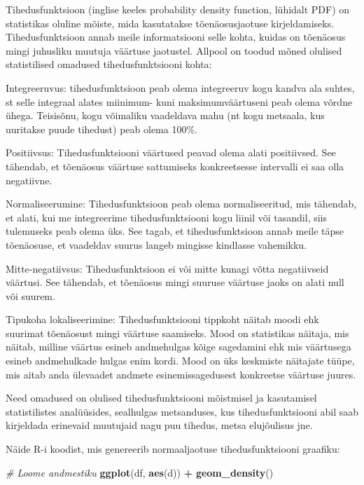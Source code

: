 \documentclass[
]{book}
\newenvironment{Shaded}{\begin{snugshade}}{\end{snugshade}}
\newcommand{\CommentTok}[1]{\textcolor[rgb]{0.56,0.35,0.01}{\textit{#1}}}
\newcommand{\FunctionTok}[1]{\textcolor[rgb]{0.13,0.29,0.53}{\textbf{#1}}}
\newcommand{\NormalTok}[1]{#1}
\newcommand{\SpecialCharTok}[1]{\textcolor[rgb]{0.81,0.36,0.00}{\textbf{#1}}}
\renewenvironment{Shaded} {\begin{snugshade}\footnotesize} {\end{snugshade}}
\begin{document}
Tihedusfunktsioon (inglise keeles probability density function, lühidalt PDF) on statistikas oluline mõiste, mida kasutatakse tõenäosusjaotuse kirjeldamiseks. Tihedusfunktsioon annab meile informatsiooni selle kohta, kuidas on tõenäosus mingi juhusliku muutuja väärtuse jaotustel. Allpool on toodud mõned olulised statistilised omadused tihedusfunktsiooni kohta:

Integreeruvus: tihedusfunktsioon peab olema integreeruv kogu kandva ala suhtes, st selle integraal alates miinimum- kuni maksimumväärtuseni peab olema võrdne ühega. Teisisõnu, kogu võimaliku vaadeldava mahu (nt kogu metsaala, kus uuritakse puude tihedust) peab olema 100\%.

Positiivsus: Tihedusfunktsiooni väärtused peavad olema alati positiivsed. See tähendab, et tõenäosus väärtuse sattumiseks konkreetsesse intervalli ei saa olla negatiivne.

Normaliseerumine: Tihedusfunktsioon peab olema normaliseeritud, mis tähendab, et alati, kui me integreerime tihedusfunktsiooni kogu liinil või tasandil, siis tulemuseks peab olema üks. See tagab, et tihedusfunktsioon annab meile täpse tõenäosuse, et vaadeldav suurus langeb mingisse kindlasse vahemikku.

Mitte-negatiivsus: Tihedusfunktsioon ei või mitte kunagi võtta negatiivseid väärtusi. See tähendab, et tõenäosus mingi suuruse väärtuse jaoks on alati null või suurem.

Tipukoha lokaliseerimine: Tihedusfunktsiooni tippkoht näitab moodi ehk suurimat tõenäosust mingi väärtuse saamiseks. Mood on statistikas näitaja, mis näitab, milline väärtus esineb andmehulgas kõige sagedamini ehk mis väärtusega esineb andmehulkade hulgas enim kordi. Mood on üks keskmiste näitajate tüüpe, mis aitab anda ülevaadet andmete esinemissagedusest konkreetse väärtuse juures.

Need omadused on olulised tihedusfunktsiooni mõistmisel ja kasutamisel statistilistes analüüsides, sealhulgas metsanduses, kus tihedusfunktsiooni abil saab kirjeldada erinevaid muutujaid nagu puu tihedus, metsa elujõulisus jne.

Näide R-i koodist, mis genereerib normaaljaotuse tihedusfunktsiooni graafiku:

\begin{Shaded}
\begin{Highlighting}[]
\CommentTok{\# Loome andmestiku}
\FunctionTok{ggplot}\NormalTok{(df, }\FunctionTok{aes}\NormalTok{(d)) }\SpecialCharTok{+}
  \FunctionTok{geom\_density}\NormalTok{()}
\end{Highlighting}
\end{Shaded}
\end{document}
